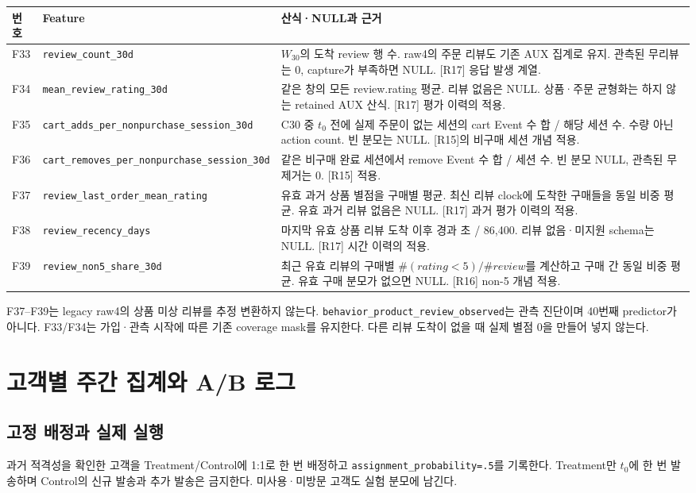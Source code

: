 \documentclass[11pt,a4paper]{article}
\newcommand{\code}[1]{{\ttfamily\footnotesize\nolinkurl{#1}}}
\newcommand{\page}{\clearpage}
\newcommand{\thead}{\rowcolor{pale}}
\begin{document}
{\small\begin{tabularx}{\linewidth}{@{}P{.06\linewidth}P{.36\linewidth}Y@{}}\thead 번호 & Feature & 산식·NULL과 근거\\\midrule
F33 & \code{review_count_30d} & $W_{30}$의 도착 review 행 수. raw4의 주문 리뷰도 기존 AUX 집계로 유지. 관측된 무리뷰는 0, capture가 부족하면 NULL. [R17] 응답 발생 계열.\\[6pt]
F34 & \code{mean_review_rating_30d} & 같은 창의 모든 review.rating 평균. 리뷰 없음은 NULL. 상품·주문 균형화는 하지 않는 retained AUX 산식. [R17] 평가 이력의 적용.\\[6pt]
F35 & \code{cart_adds_per_nonpurchase_session_30d} & C30 중 $t_0$ 전에 실제 주문이 없는 세션의 cart Event 수 합 / 해당 세션 수. 수량 아닌 action count. 빈 분모는 NULL. [R15]의 비구매 세션 개념 적용.\\[6pt]
F36 & \code{cart_removes_per_nonpurchase_session_30d} & 같은 비구매 완료 세션에서 remove Event 수 합 / 세션 수. 빈 분모 NULL, 관측된 무제거는 0. [R15] 적용.\\[6pt]
F37 & \code{review_last_order_mean_rating} & 유효 과거 상품 별점을 구매별 평균. 최신 리뷰 clock에 도착한 구매들을 동일 비중 평균. 유효 과거 리뷰 없음은 NULL. [R17] 과거 평가 이력의 적용.\\[6pt]
F38 & \code{review_recency_days} & 마지막 유효 상품 리뷰 도착 이후 경과 초 / 86,400. 리뷰 없음·미지원 schema는 NULL. [R17] 시간 이력의 적용.\\[6pt]
F39 & \code{review_non5_share_30d} & 최근 유효 리뷰의 구매별 $\#(rating<5)/\#review$를 계산하고 구매 간 동일 비중 평균. 유효 구매 분모가 없으면 NULL. [R16] non-5 개념 적용.\\\bottomrule\end{tabularx}}

F37--F39는 legacy raw4의 상품 미상 리뷰를 추정 변환하지 않는다. \code{behavior_product_review_observed}는 관측 진단이며 40번째 predictor가 아니다. F33/F34는 가입·관측 시작에 따른 기존 coverage mask를 유지한다. 다른 리뷰 도착이 없을 때 실제 별점 0을 만들어 넣지 않는다.

\page
\section{고객별 주간 집계와 A/B 로그}
\subsection{고정 배정과 실제 실행}
과거 적격성을 확인한 고객을 Treatment/Control에 1:1로 한 번 배정하고 \code{assignment_probability=.5}를 기록한다. Treatment만 $t_0$에 한 번 발송하며 Control의 신규 발송과 추가 발송은 금지한다. 미사용·미방문 고객도 실험 분모에 남긴다.
\end{document}
